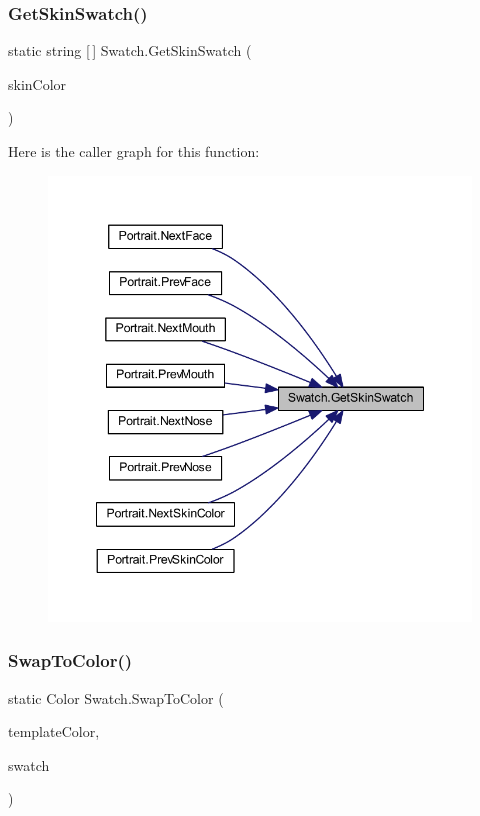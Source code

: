 \subsubsection{\texorpdfstring{GetSkinSwatch()}{GetSkinSwatch()}}
{\footnotesize\ttfamily static string \mbox{[}$\,$\mbox{]} Swatch.\+Get\+Skin\+Swatch (\begin{DoxyParamCaption}\item[{\mbox{\hyperlink{class_character_a726214a0fe480fffada7772697764824}{Character.\+Skin\+Color}}}]{skin\+Color }\end{DoxyParamCaption})\hspace{0.3cm}{\ttfamily [static]}}

Here is the caller graph for this function\+:\nopagebreak
\begin{figure}[H]
\begin{center}
\leavevmode
\includegraphics[width=348pt]{class_swatch_aad8681cfc4c7902a684220e08e67b00b_icgraph}
\end{center}
\end{figure}
\mbox{\label{class_swatch_aa6e64b48c8403d88179beb90da11c2f8}} 
\subsubsection{\texorpdfstring{SwapToColor()}{SwapToColor()}}
{\footnotesize\ttfamily static Color Swatch.\+Swap\+To\+Color (\begin{DoxyParamCaption}\item[{Color}]{template\+Color,  }\item[{Color \mbox{[}$\,$\mbox{]}}]{swatch }\end{DoxyParamCaption})\hspace{0.3cm}{\ttfamily [static]}}

